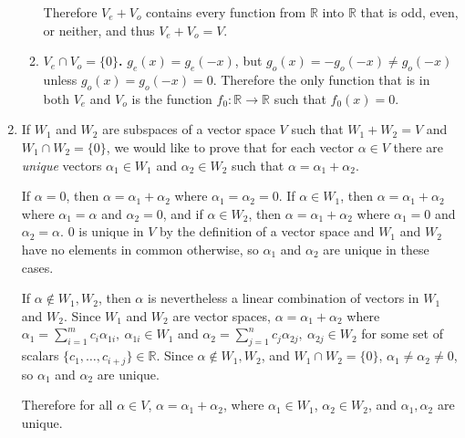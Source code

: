 \documentclass[12pt]{article}
\begin{document}
\begin{enumerate}
\begin{enumerate}
          Therefore $V_e + V_o$ contains every function from $\mathbb{R}$ into
          $\mathbb{R}$ that is odd, even, or neither, and thus $V_e + V_o = V$.

        \item
          \textbf{$V_e \cap V_o = \{0\}$.} $g_e(x) = g_e(-x)$, but $g_o(x) =
          -g_o(-x) \neq g_o(-x)$ unless $g_o(x) = g_o(-x) = 0$. Therefore the only
          function that is in both $V_e$ and $V_o$ is the function $f_0: \mathbb{R}
          \to \mathbb{R}$ such that $f_0(x) = 0$.
      \end{enumerate}

    \item
      If $W_1$ and $W_2$ are subspaces of a vector space $V$ such that $W_1 + W_2 =
      V$ and $W_1 \cap W_2 = \{0\}$, we would like to prove that for each vector
      $\alpha \in V$ there are \textit{unique} vectors $\alpha_1 \in W_1$ and
      $\alpha_2 \in W_2$ such that $\alpha = \alpha_1 + \alpha_2$.

      If $\alpha = 0$, then $\alpha = \alpha_1 + \alpha_2$ where $\alpha_1 = \alpha_2
      = 0$. If $\alpha \in W_1$, then $\alpha = \alpha_1 + \alpha_2$ where $\alpha_1
      = \alpha$ and $\alpha_2 = 0$, and if $\alpha \in W_2$, then $\alpha = \alpha_1
      + \alpha_2$ where $\alpha_1 = 0$ and $\alpha_2 = \alpha$. $0$ is unique in $V$
      by the definition of a vector space and $W_1$ and $W_2$ have no elements in
      common otherwise, so $\alpha_1$ and $\alpha_2$ are unique in these cases.

      If $\alpha \notin W_1,W_2$, then $\alpha$ is nevertheless a linear combination
      of vectors in $W_1$ and $W_2$. Since $W_1$ and $W_2$ are vector spaces, $\alpha
      = \alpha_1 + \alpha_2$ where $\alpha_1 = \sum_{i = 1}^{m}c_i\alpha_{1i},\
      \alpha_{1i} \in W_1$ and $\alpha_2 = \sum_{j = 1}^{n}c_j\alpha_{2j},\
      \alpha_{2j} \in W_2$ for some set of scalars $\{c_1,\ldots,c_{i+j}\} \in
      \mathbb{R}$. Since $\alpha \notin W_1,W_2$, and $W_1 \cap W_2 = \{0\}$,
      $\alpha_1 \neq \alpha_2 \neq 0$, so $\alpha_1$ and $\alpha_2$ are unique.

      Therefore for all $\alpha \in V$, $\alpha = \alpha_1 + \alpha_2$, where
      $\alpha_1 \in W_1$, $\alpha_2 \in W_2$, and $\alpha_1,\alpha_2$ are unique.
  \end{enumerate}
\end{document}
